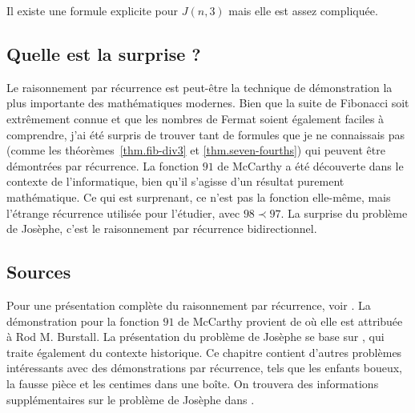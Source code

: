 Il existe une formule explicite pour $J(n,3)$ mais elle est assez compliquée.


\subsection*{Quelle est la surprise ?}

Le raisonnement par  récurrence est peut-être la technique de démonstration la plus importante des mathématiques modernes. Bien que la suite de Fibonacci soit extrêmement connue et que les nombres de Fermat soient également faciles à comprendre, j'ai été surpris de trouver tant de formules que je ne connaissais pas (comme les  théorèmes~\ref{thm.fib-div3} et \ref{thm.seven-fourths}) qui peuvent être démontrées par récurrence. La fonction $91$ de McCarthy a été découverte dans le contexte de l'informatique, bien qu'il s'agisse d'un résultat purement mathématique. Ce qui est surprenant, ce n'est pas la fonction elle-même, mais l'étrange récurrence utilisée pour l'étudier, avec  $98\prec 97$. La surprise du problème de Josèphe, c'est  le raisonnement  par récurrence  bidirectionnel.

\subsection*{Sources}

Pour une présentation complète du raisonnement par récurrence, voir \cite{gunderson}. La démonstration pour la fonction $91$ de McCarthy provient de \cite{manna} où elle est attribuée à Rod M. Burstall. La présentation du problème de Josèphe se base sur \cite[chapitre~17]{gunderson}, qui traite également du contexte historique. Ce chapitre contient d'autres problèmes intéressants avec des démonstrations par récurrence, tels que les enfants boueux, la fausse pièce et les centimes dans une boîte. On  trouvera des informations supplémentaires sur le problème de Josèphe dans \cite{schumer,wiki:josephus}.
